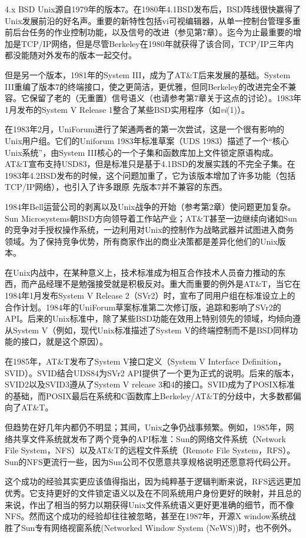 \documentclass[12pt,oneside]{book}
\begin{document}
\begin{common-format}
4.x BSD Unix源自1979年的版本7。在1980年4.1BSD发布后，BSD阵线很快赢得了Unix发展前沿的好名声。重要的新特性包括vi可视编辑器，从单一控制台管理多重前后台任务的作业控制功能，以及信号的改进（参见第7章）。迄今为止最重要的增加是TCP/IP网络，但是尽管Berkeley在1980年就获得了该合同，TCP/IP三年内都没能随对外发布的版本一起交付。

但是另一个版本，1981年的System III，成为了AT\&{}T后来发展的基础。System III重编了版本7的终端接口，使之更简洁，更优雅，但同Berkeley的改进完全不兼容。它保留了老的（无重置）信号语义（也请参考第7章关于这点的讨论）。1983年1月发布的System V Release 1整合了某些BSD实用程序（如\textit{vi}(1)）。

在1983年2月，UniForum进行了架通两者的第一次尝试，这是一个很有影响的Unix用户组。它们的Uniforum 1983年标准草案（UDS 1983）描述了一个“核心Unix系统”，由System III核心的一个子集和函数库加上文件锁定原语构成。AT\&{}T宣布支持USD83，但是标准只是基于4.1BSD的发展实践的不完全子集。在1983年4.2BSD发布的时候，这个问题加重了，它为该版本增加了许多功能（包括TCP/IP网络），也引入了许多跟原
先版本7并不兼容的东西。

1984年Bell运营公司的剥离以及Unix战争的开始（参考第2章）使问题更加复杂。Sun Microsystems朝BSD方向领导着工作站产业；AT\&{}T甚至一边继续向诸如Sun的竞争对手授权操作系统，一边利用对Unix的控制作为战略武器并试图进入商务领域。为了保持竞争优势，所有商家作出的商业决策都是差异化他们的Unix版本。

在Unix内战中，在某种意义上，技术标准成为相互合作技术人员奋力推动的东西，而产品经理不是勉强接受就是积极反对。重大而重要的例外是AT\&{}T，当它在1984年1月发布System V Release 2（SVr2）时，宣布了同用户组在标准设立上的合作计划。1984年的UniForum草案标准第二次修订版，追踪和影响了SVr2的API。后来的Unix标准中，除了某些BSD功能在效用上特别领先的领域，均倾向遵从System V（例如，现代Unix标准描述了System V的终端控制而不是BSD同样功能的接口，就是这个原因）。

在1985年，AT\&{}T发布了System V接口定义（System V Interface Definition，SVID）。SVID结合UDS84为SVr2 API提供了一个更为正式的说明。后来的版本，SVID2以及SVID3遵从了System V release 3和4的接口。SVID成为了POSIX标准的基础，而POSIX最后在系统和C函数库上Berkeley/AT\&{}T的分歧中，大多数都偏向了AT\&{}T。

但趋势在好几年内都仍不明显；其间，Unix之争仍战事频繁。例如，1985年，网络共享文件系统就发布了两个竞争的API标准：Sun的网络文件系统（Network File System，NFS）以及AT\&{}T的远程文件系统（Remote File System，RFS）。Sun的NFS更流行一些，因为Sun公司不仅愿意共享规格说明还愿意将代码公开。

这个成功的经验其实更应该值得指出，因为纯粹基于逻辑判断来说，RFS远远更加优秀。它支持更好的文件锁定语义以及在不同系统用户身份更好的映射，并且总的来说，作出了相当的努力以期获得Unix文件系统语义更好更准确的细节，而不像NFS。然而这个成功的经验却往往被忽略，甚至在1987年，开源X window系统战胜了Sun专有网络视窗系统(Networked Window System (NeWS))时，也不例外。


\end{common-format}
\end{document}

